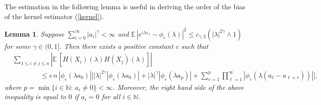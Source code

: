 \documentclass[11pt]{article}
\newtheorem{lemma}{Lemma}[section]
\def\E{{{\mathbb E}\,}}
\def\N{{\mathbb N}}
\begin{document}
The estimation in the following lemma is useful in deriving the order of the bias of the kernel estimator (\ref{kernel}).
\begin{lemma} \label{lma1} Suppose $\sum\limits^{\infty}_{i=0}|a_i|^{\gamma}<\infty$ and $\E|e^{\iota \lambda \varepsilon_1}-\phi_{\varepsilon}(\lambda)|^{2}\leq c_{\gamma,2} \left(|\lambda|^{2\gamma}\wedge 1\right)$ for some $\gamma \in (0,1]$. Then there exists a positive constant $c$ such that
\begin{align*} \label{lminq}
&\sum_{1\leq i\neq j\leq n} \left| \E\left[H(X_i)(\lambda)\overline{H(X_j)(\lambda)}\right]\right| \nonumber\\
&\qquad\qquad \leq c\, n\, |\phi_{\varepsilon}(\lambda a_{0})|\Big[ |\lambda|^{2\gamma}|\phi_{\varepsilon}(\lambda a_{0})|+|\lambda|^{\gamma}|\phi_{\varepsilon}(\lambda a_p)| + 
\sum^p_{r=1}\prod^{\infty}_{\ell=1} |\phi_{\varepsilon}(\lambda (a_{\ell}-a_{\ell+r}))|\Big],
\end{align*}
where $p=\min\{i\in\N:\, a_i\neq 0\}<\infty$. Moreover, the right hand side of the above inequality is equal to $0$ if $a_i=0$ for all $i\in\N$.
\end{lemma}
\end{document}
